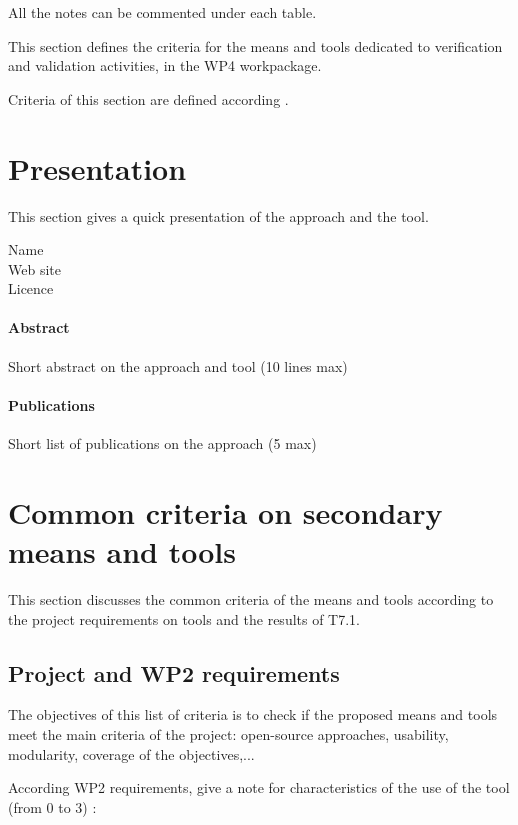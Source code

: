 All the notes can be commented under each table.

This section defines the criteria for the means and tools dedicated to verification and validation activities, in the WP4 workpackage. 

Criteria of this section are defined according \citep{D4.1}.

\section{Presentation}

This section gives a quick presentation of the approach and the tool.

\begin{description}
\item[Name] 
\item[Web site] 
\item[Licence] 
\end{description}

\paragraph{Abstract} Short abstract on the approach and tool (10 lines max)

\paragraph{Publications} Short list of publications on the approach (5 max)


\section{Common criteria on secondary means and tools}
\label{common}
This section discusses the common criteria of the means and tools according to the project requirements on tools and the results of T7.1.

\subsection{Project and WP2 requirements}

The objectives of this list of criteria is to check if the proposed means and tools meet the main criteria of the project: open-source approaches, usability, modularity, coverage of the objectives,...

According WP2 requirements, give a note for characteristics of the use of the tool (from 0 to 3) :

